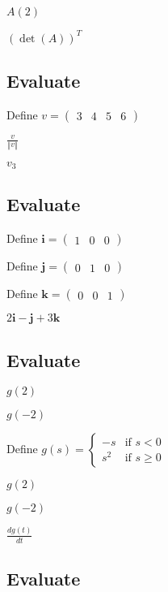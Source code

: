 \documentclass{article}
\begin{document}
$A(2)$

$\left( \det \left( A\right) \right) ^{T}$

\subsection{Evaluate}

Define $v=\left( 
\begin{array}{cccc}
3 & 4 & 5 & 6%
\end{array}%
\right) $

$\frac{v}{\left\Vert v\right\Vert }$

$v_{3}$

\subsection{Evaluate}

Define $\mathbf{i}=\left( 
\begin{array}{ccc}
1 & 0 & 0%
\end{array}%
\right) $

Define $\mathbf{j}=\left( 
\begin{array}{ccc}
0 & 1 & 0%
\end{array}%
\right) $

Define $\mathbf{k}=\left( 
\begin{array}{ccc}
0 & 0 & 1%
\end{array}%
\right) $

$2\mathbf{i}-\mathbf{j}+3\mathbf{k}$

\subsection{Evaluate}

$g\left( 2\right) $

$g\left( -2\right) $

Define $g\left( s\right) =\left\{ 
\begin{array}{cc}
-s & \text{if }s<0 \\ 
s^{2} & \text{if }s\geq 0%
\end{array}%
\right. $

$g(2)$

$g\left( -2\right) $

$\frac{dg(t)}{dt}$

\subsection{Evaluate}
\end{document}
